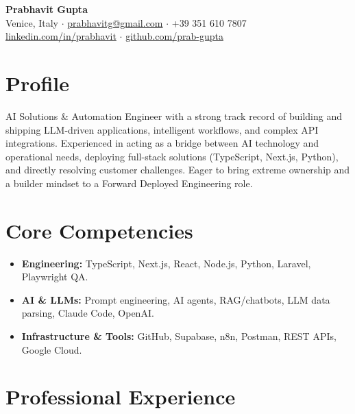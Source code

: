 \documentclass[11pt,a4paper]{article}
\begin{document}
\pagestyle{empty}

\begin{center}
    {\LARGE \textbf{Prabhavit Gupta}} \\
    \vspace{0.5em}
    Venice, Italy $\cdot$ \href{mailto:prabhavitg@gmail.com}{prabhavitg@gmail.com} $\cdot$ +39 351 610 7807 \\
    \href{https://www.linkedin.com/in/prabhavit/}{linkedin.com/in/prabhavit} $\cdot$ \href{https://github.com/prab-gupta}{github.com/prab-gupta}
\end{center}

\vspace{0.5em}
\section{Profile}
AI Solutions \& Automation Engineer with a strong track record of building and shipping LLM-driven applications, intelligent workflows, and complex API integrations. Experienced in acting as a bridge between AI technology and operational needs, deploying full-stack solutions (TypeScript, Next.js, Python), and directly resolving customer challenges. Eager to bring extreme ownership and a builder mindset to a Forward Deployed Engineering role.

\section{Core Competencies}
\begin{itemize}[leftmargin=*,noitemsep]
    \item \textbf{Engineering:} TypeScript, Next.js, React, Node.js, Python, Laravel, Playwright QA.
    \item \textbf{AI \& LLMs:} Prompt engineering, AI agents, RAG/chatbots, LLM data parsing, Claude Code, OpenAI.
    \item \textbf{Infrastructure \& Tools:} GitHub, Supabase, n8n, Postman, REST APIs, Google Cloud.
\end{itemize}

\section{Professional Experience}
\end{document}
